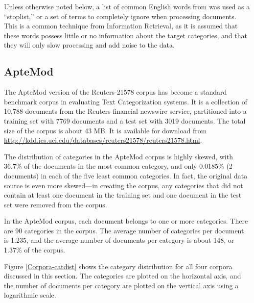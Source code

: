 Unless otherwise noted below, a list of common English words from
\cite{salton:89} was used as a ``stoplist,'' or a set of terms to
completely ignore when processing documents.  This is a common technique from
Information Retrieval,\cite{XXX-manning} as it is assumed that these words
possess little or no information about the target categories, and that
they will only slow processing and add noise to the data.


\subsection{ApteMod}


The ApteMod version of the Reuters-21578 corpus has become a
standard benchmark corpus in evaluating Text Categorization
systems.\cite{yang:99} It is a collection of 10,788 documents from the
Reuters financial newswire service, partitioned into a training set with 7769
documents and a test set with 3019 documents.  The total size of the
corpus is about 43 MB.  It is available for download from
\url{http://kdd.ics.uci.edu/databases/reuters21578/reuters21578.html}.

The distribution of categories in the ApteMod corpus is highly skewed,
with 36.7\% of the documents in the most common category, and only
0.0185\% (2 documents) in each of the five least common categories.
In fact, the original data source is even more skewed---in creating
the corpus, any categories that did not contain at least one document
in the training set and one document in the test set were removed from
the corpus.\cite{yang:99}

In the ApteMod corpus, each document belongs to one or more
categories.  There are 90 categories in the corpus.  The average
number of categories per document is 1.235, and the average number of
documents per category is about 148, or 1.37\% of the corpus.

Figure \ref{Corpora-catdist} shows the category distribution for all
four corpora discussed in this section.  The categories are plotted on
the horizontal axis, and the number of documents per category are
plotted on the vertical axis using a logarithmic scale.

